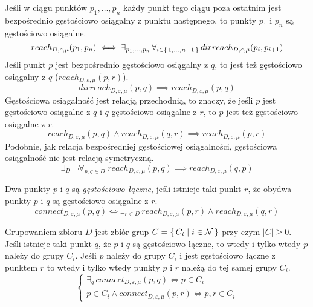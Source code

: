 \newline
Jeśli w ciągu punktów $ p_1,\dots,p_n $ każdy punkt tego ciągu poza ostatnim jest bezpośrednio gęstościowo osiągalny z punktu następnego, to punkty $ p_1 $ i $ p_n $ są gęstościowo osiągalne.
\begin{equation}
	reach_{D,\varepsilon,\mu}(p_1, p_n)	\iff 	\exists_{p_1,\dots,p_n}\,\forall_{i\in\set{1,\dots,n-1}}\,dirreach_{D,\varepsilon,\mu}(p_i, p_{i+1})
\end{equation}
Jeśli punkt $ p $ jest bezpośrednio gęstościowo osiągalny z $ q $, to jest też gęstościowo osiągalny z $ q $ ($ reach_{D,\varepsilon,\mu}(p, r) $). 
\begin{equation}
	dirreach_{D,\varepsilon,\mu}(p, q) \implies reach_{D,\varepsilon,\mu}(p, q)
\end{equation}
Gęstościowa osiągalność jest relacją przechodnią, to znaczy, że jeśli $ p $ jest gęstościowo osiągalne z $ q $  i $ q $ gęstościowo osiągalne z $ r $, to $ p $ jest też gęstościowo osiągalne z $ r $.
\begin{equation}
	reach_{D,\varepsilon,\mu}(p, q) \land reach_{D,\varepsilon,\mu}(q, r) \implies reach_{D,\varepsilon,\mu}(p, r)
\end{equation}
Podobnie, jak relacja bezpośredniej gęstościowej osiągalności, gęstościowa osiągalność nie jest relacją symetryczną.
\begin{equation}
	\exists_D\;\neg\forall_{p,q\in D}\;reach_{D,\varepsilon,\mu}(p, q) \implies reach_{D,\varepsilon,\mu}(q, p)
\end{equation}

\newline
Dwa punkty $ p $ i $ q $ są \textit{gęstościowo łączne}, jeśli istnieje taki punkt $ r $, że obydwa punkty $ p $ i $ q $ są gęstościowo osiągalne z $ r $.
\begin{equation}
	connect_{D,\varepsilon,\mu}(p, q) \iff \exists_{r\in D}\,reach_{D,\varepsilon,\mu}(p, r) \land reach_{D,\varepsilon,\mu}(q, r)
\end{equation}

\newline
Grupowaniem zbioru $ D $ jest zbiór grup $C = \set{C_i | i \in \mathcal{N}} $ przy czym $ |C| \ge 0$.
Jeśli istnieje taki punkt $ q $, że $ p $ i $ q $ są gęstościowo łączne, to wtedy i tylko wtedy $ p $ należy do grupy $ C_i $. Jeśli $ p $ należy do grupy $ C_i $ i jest gęstościowo łączne z punktem $ r $ to wtedy i tylko wtedy punkty $ p $ i $ r $ należą do tej samej grupy $ C_i $.
\begin{equation}
\left\{
\begin{array}{l}
\exists_q\,connect_{D,\varepsilon,\mu}(p,q) \iff p\in C_i \\
p \in C_i \land connect_{D,\varepsilon,\mu}(p,r) \iff p,r\in C_i 
\end{array}
\right.
\end{equation}

